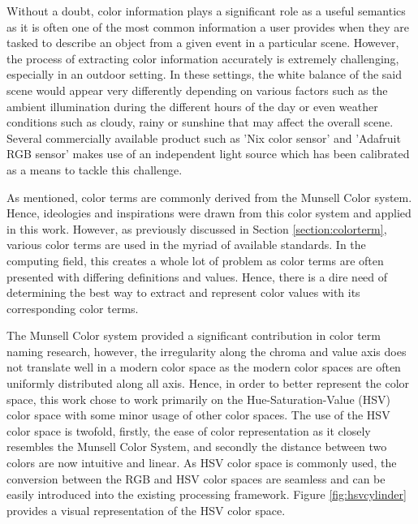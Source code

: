 Without a doubt, color information plays a significant role as a useful semantics as it is often one of the most common information a user provides when they are tasked to describe an object from a given event in a particular scene. However, the process of extracting color information accurately is extremely challenging, especially in an outdoor setting. In these settings, the white balance of the said scene would appear very differently depending on various factors such as the ambient illumination during the different hours of the day or even weather conditions such as cloudy, rainy or sunshine that may affect the overall scene. Several commercially available product such as 'Nix color sensor' \cite{nixsensorltd} and 'Adafruit RGB sensor' \cite{adafruit} makes use of an independent light source which has been calibrated as a means to tackle this challenge.

As mentioned, color terms are commonly derived from the Munsell Color system. Hence, ideologies and inspirations were drawn from this color system and applied in this work. However, as previously discussed in Section \ref{section:colorterm}, various color terms are used in the myriad of available standards. In the computing field, this creates a whole lot of problem as color terms are often presented with differing definitions and values. Hence, there is a dire need of determining the best way to extract and represent color values with its corresponding color terms. 




The Munsell Color system provided a significant contribution in color term naming research, however, the irregularity along the chroma and value axis does not translate well in a modern color space as the modern color spaces are often uniformly distributed along all axis. Hence, in order to better represent the color space, this work chose to work primarily on the Hue-Saturation-Value (HSV) color space with some minor usage of other color spaces. The use of the HSV color space is twofold, firstly, the ease of color representation as it closely resembles the Munsell Color System, and secondly the distance between two colors are now intuitive and linear. As HSV color space is commonly used, the conversion between the RGB and HSV color spaces are seamless and can be easily introduced into the existing processing framework. Figure \ref{fig:hsvcylinder} provides a visual representation of the HSV color space.

